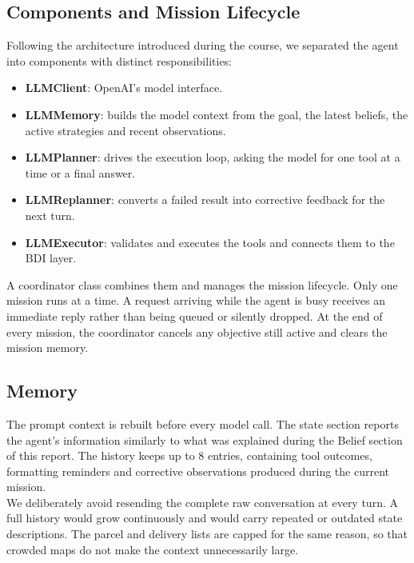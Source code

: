 \documentclass[11pt,a4paper]{article}
\begin{document}
\subsection{Components and Mission Lifecycle}
Following the architecture introduced during the course, we separated the agent into components
with distinct responsibilities:
\begin{itemize}
    \item \textbf{LLMClient}: OpenAI's model interface.
    \item \textbf{LLMMemory}: builds the model context from the goal, the latest beliefs, the active strategies and recent observations.
    \item \textbf{LLMPlanner}: drives the execution loop, asking the model for one tool at a time or a final answer.
    \item \textbf{LLMReplanner}: converts a failed result into corrective feedback for the next turn.
    \item \textbf{LLMExecutor}: validates and executes the tools and connects them to the BDI layer.
\end{itemize}
A coordinator class combines them and manages the mission lifecycle.
Only one mission runs at a time. 
A request arriving while the agent is busy receives an immediate reply rather than being queued or silently dropped.
At the end of every mission, the coordinator cancels any objective still active and clears the mission memory.

\subsection{Memory}
The prompt context is rebuilt before every model call.
The state section reports the agent's information similarly to what was explained during the Belief section of this report.
The history keeps up to 8 entries, containing tool outcomes, formatting reminders and corrective observations produced during the current mission.
\\We deliberately avoid resending the complete raw conversation at every turn. A full history
would grow continuously and would carry repeated or outdated state descriptions.
The parcel and delivery lists are capped for the same reason, so that crowded maps do not make the context unnecessarily large.
\end{document}
